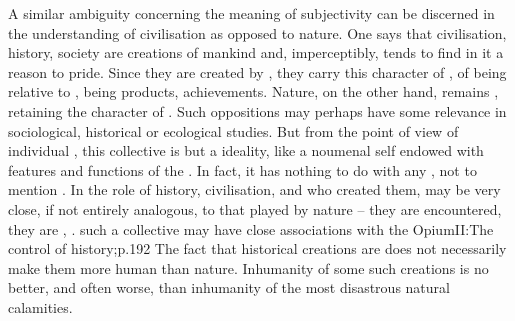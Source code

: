 \label{civObjSubj} A similar ambiguity concerning
the meaning of subjectivity can be
discerned in the understanding of civilisation as opposed to nature. One says
that civilisation, history, society are creations of mankind and, imperceptibly,
tends to find in it a reason to pride.  Since they are created by , they
carry this character of , of being relative to , being
 products,  achievements. Nature, on the other hand, remains
, retaining the character of . Such
oppositions may perhaps have some relevance in sociological, historical or
ecological studies. But from the point of view of individual ,
this collective  is but a  ideality, like a noumenal self
endowed with features and functions of the . In fact, it
has nothing to do with any , not to mention .  In  the role of history, civilisation, and  who created them,
may be very close, if not entirely analogous, to that played by nature -- they
are encountered, they are ,  .
 such a collective  may have close associations with
the \citet{idolatry of history [which] is born of this unavowed nostalgia for a
  future which would justify the unjustifiable.}{Opium}{II:The control of
  history;p.192} The fact that historical creations are  does not
necessarily make them more human than nature. Inhumanity of some such creations
is no better, and often worse, than inhumanity of the most disastrous natural
calamities.

